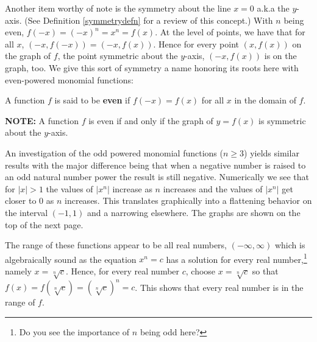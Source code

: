 \documentclass{ximera}
\begin{document}

Another item worthy of note is the symmetry about the line $x =0$ a.k.a the $y$-axis. (See Definition \ref{symmetrydefn} for a review of this concept.) With $n$ being even, $f(-x) = (-x)^n = x^n = f(x)$.  At the level of points, we have that for all $x$, $(-x, f(-x)) = (-x,f(x))$.  Hence for every point $(x, f(x))$ on the graph of $f$,  the point symmetric about the $y$-axis, $(-x, f(x))$ is on the graph, too.  We give this sort of symmetry a name honoring its roots here with even-powered monomial functions:



\begin{definition} \label{evenfunctiondefn} A function $f$ is said to be \textbf{even} if $f(-x) = f(x)$ for all $x$ in the domain of $f$.  

\textbf{NOTE:}  A function  $f$ is even if and only if the graph of  $y = f(x)$ is symmetric about the $y$-axis.

\end{definition}



An investigation of the odd powered monomial functions ($n \geq 3$) yields similar results with the major difference being that when a negative number is raised to an odd natural number power the result is still negative.  Numerically we see that for $|x| > 1$ the values of $|x^n|$ increase as $n$ increases and the values of $|x^n|$ get closer to $0$ as $n$ increases.  This translates graphically into a flattening behavior on the interval $(-1, 1)$ and a narrowing elsewhere.  The graphs are shown on the top of the next page.


The range of these functions appear to be all real numbers, $(-\infty, \infty)$ which is algebraically sound as the equation $x^n = c$ has a solution for every real number,\footnote{Do you see the importance of $n$ being odd here?} namely $x = \sqrt[n]{c}$.  Hence, for every real number $c$,  choose $x = \sqrt[n]{c}$ so that $f(x) = f(\sqrt[n]{c}) = (\sqrt[n]{c})^n =c$.  This shows that every real number is in the range of $f$.
\end{document}
